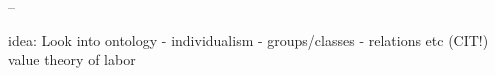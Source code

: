 




--

idea:
Look into ontology
- individualism
- groups/classes
- relations etc
(CIT!)
value theory of labor

